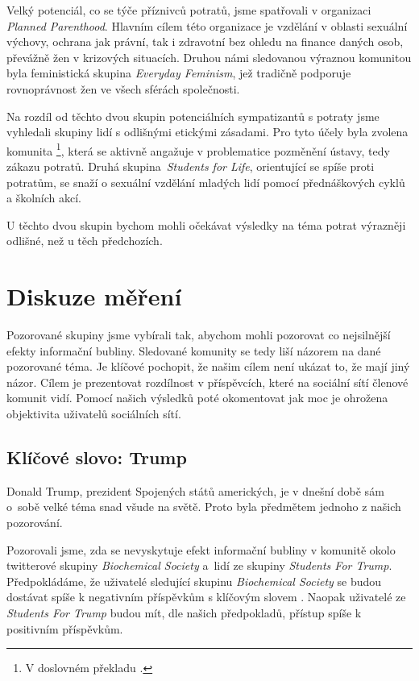\documentclass[12pt, a4paper]{article}
\numberwithin{equation}{section} 	%
\begin{document}
Velký potenciál, co se týče příznivců potratů, jsme spatřovali v organizaci \textit{Planned Parenthood}. Hlavním cílem této organizace je vzdělání v oblasti sexuální výchovy, ochrana jak právní, tak i zdravotní bez ohledu na finance daných osob, převážně žen v krizových situacích. Druhou námi sledovanou výraznou komunitou byla feministická skupina \textit{Everyday Feminism}, jež tradičně podporuje rovnoprávnost žen ve všech sférách společnosti.

Na rozdíl od těchto dvou skupin potenciálních sympatizantů s potraty jsme vyhledali skupiny lidí s odlišnými etickými zásadami. Pro tyto účely byla zvolena komunita \textit{}\footnote{V doslovném překladu \textit{}.}, která se aktivně angažuje v problematice pozměnění ústavy, tedy zákazu potratů. Druhá skupina~\textit{Students for Life}, orientující se spíše proti potratům, se snaží o sexuální vzdělání mladých lidí pomocí přednáškových cyklů a školních akcí.

U těchto dvou skupin bychom mohli očekávat výsledky na téma potrat výrazněji odlišné, než u těch předchozích.

\newpage
\section{Diskuze měření}
\noindent Pozorované skupiny jsme vybírali tak, abychom mohli pozorovat co nejsilnější efekty informační bubliny. Sledované komunity se tedy liší názorem na dané pozorované téma.  Je klíčové pochopit, že našim cílem není ukázat to, že mají jiný názor. Cílem je prezentovat rozdílnost v příspěvcích, které na sociální sítí členové komunit vidí. Pomocí našich výsledků poté okomentovat jak moc je ohrožena objektivita uživatelů sociálních sítí.



\subsection{Klíčové slovo: Trump}\label{subsec:Trump}
\noindent Donald Trump, prezident Spojených států amerických, je v dnešní době sám o~sobě velké téma snad všude na světě. Proto byla předmětem jednoho z našich pozorování.

Pozorovali jsme, zda se nevyskytuje efekt informační bubliny v komunitě okolo twitterové skupiny \textit{Biochemical Society} a~lidí ze skupiny \textit{Students For Trump}. Předpokládáme, že uživatelé sledující skupinu \textit{Biochemical Society} se budou dostávat spíše k negativním příspěvkům s klíčovým slovem \textit{}. Naopak uživatelé ze \textit{Students For Trump} budou mít, dle našich předpokladů, přístup spíše k positivním příspěvkům.
\end{document}
